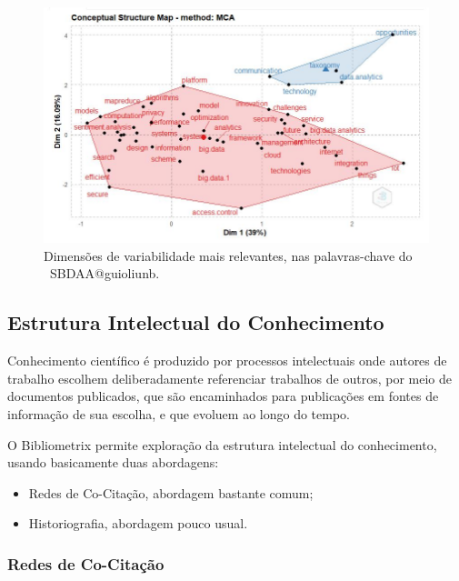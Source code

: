 \begin{figure}
    \centering
    \includegraphics[width=1\textwidth]{experiments/guioliunb/AnaliseBibliometrica/SocialBigDataAnalysis/conceptual factorial.JPG}
    \caption{Dimensões de variabilidade mais relevantes, nas palavras-chave do  \dataset\ SBDAA@guioliunb.}
    \label{fig:MASSA2-FactorialAnalysis-MCA-FactorialMap}
\end{figure}


\subsection{Estrutura Intelectual  do Conhecimento}

Conhecimento científico é produzido por processos intelectuais onde autores de trabalho escolhem deliberadamente referenciar trabalhos de outros, por meio de documentos publicados, que são encaminhados para publicações em fontes de informação de sua escolha, e que evoluem ao longo do tempo.

O Bibliometrix permite exploração da estrutura intelectual do conhecimento, usando basicamente duas abordagens:
\begin{itemize}
    \item Redes de Co-Citação, abordagem bastante comum;
    \item Historiografia, abordagem pouco usual.
\end{itemize}

\subsubsection{Redes de Co-Citação}


